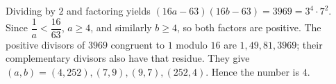 Dividing by $2$ and factoring yields $(16a-63)(16b-63)=3969=3^4\cdot7^2$. Since $\dfrac{1}{a}<\dfrac{16}{63}$, $a\ge4$, and similarly $b\ge4$, so both factors are positive. The positive divisors of $3969$ congruent to $1$ modulo $16$ are $1,49,81,3969$; their complementary divisors also have that residue. They give $(a,b)=(4,252),(7,9),(9,7),(252,4)$. Hence the number is $\boxed4$.
